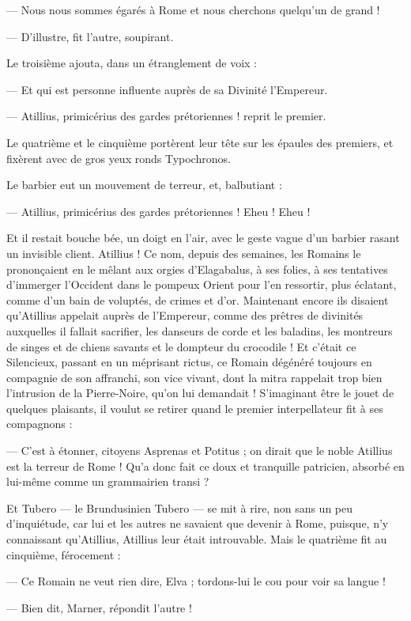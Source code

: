 \documentclass[a4paper, 11pt, oneside, polutonikogreek, french]{article}
\begin{document}
--- Nous nous sommes égarés à Rome et nous cherchons quelqu'un de grand !

--- D'illustre, fit l'autre, soupirant.

Le troisième ajouta, dans un étranglement de voix :

--- Et qui est personne influente auprès de sa Divinité l'Empereur.

--- Atillius, primicérius des gardes prétoriennes ! reprit le premier.

Le quatrième et le cinquième portèrent leur tête sur les épaules des premiers, et fixèrent avec de gros yeux ronds Typochronos.

Le barbier eut un mouvement de terreur, et, balbutiant :

--- Atillius, primicérius des gardes prétoriennes ! Eheu ! Eheu !

Et il restait bouche bée, un doigt en l'air, avec le geste vague d'un barbier rasant un invisible client. Atillius ! Ce nom, depuis des semaines, les Romains le prononçaient en le mêlant aux orgies d'Elagabalus, à ses folies, à ses tentatives d'immerger l'Occident dans le pompeux Orient pour l'en ressortir, plus éclatant, comme d'un bain de voluptés, de crimes et d'or. Maintenant encore ils disaient qu'Atillius appelait auprès de l'Empereur, comme des prêtres de divinités auxquelles il fallait sacrifier, les danseurs de corde et les baladins, les montreurs de singes et de chiens savants et le dompteur du crocodile ! Et c'était ce Silencieux, passant en un méprisant rictus, ce Romain dégénéré toujours en compagnie de son affranchi, son vice vivant, dont la mitra rappelait trop bien l'intrusion de la Pierre-Noire, qu'on lui demandait ! S'imaginant être le jouet de quelques plaisants, il voulut se retirer quand le premier interpellateur fit à ses compagnons :

--- C'est à étonner, citoyens Asprenas et Potitus ; on dirait que le noble Atillius est la terreur de Rome ! Qu'a donc fait ce doux et tranquille patricien, absorbé en lui-même comme un grammairien transi ?

Et Tubero --- le Brundusinien Tubero --- se mit à rire, non sans un peu d'inquiétude, car lui et les autres ne savaient que devenir à Rome, puisque, n'y connaissant qu'Atillius, Atillius leur était introuvable. Mais le quatrième fit au cinquième, férocement :

--- Ce Romain ne veut rien dire, Elva ; tordons-lui le cou pour voir sa langue !

--- Bien dit, Marner, répondit l'autre !
\end{document}
